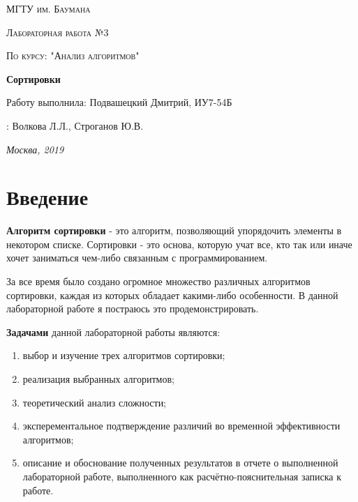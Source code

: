 \documentclass[12pt]{report}
\begin{document}
\begin{titlepage}
	\centering
	{\scshape\LARGE МГТУ им. Баумана \par}
	\vspace{3cm}
	{\scshape\Large Лабораторная работа №3\par}
	\vspace{0.5cm}	
	{\scshape\Large По курсу: "Анализ алгоритмов"\par}
	\vspace{1.5cm}
	{\huge\bfseries Сортировки\par}
	\vspace{2cm}
	\Large Работу выполнила: Подвашецкий Дмитрий, ИУ7-54Б\par
	\vspace{0.5cm}
	:  Волкова Л.Л., Строганов Ю.В.\par

	\vfill
	\large \textit {Москва, 2019} \par
\end{titlepage}

\tableofcontents

\newpage
\chapter*{Введение}

	\textbf{Алгоритм сортировки} - это алгоритм, позволяющий упорядочить элементы в некотором списке. Сортировки - это основа, которую учат все, кто так или иначе хочет заниматься чем-либо связанным с программированием. 

	За все время было создано огромное множество различных алгоритмов сортировки, каждая из которых обладает какими-либо особенности. В данной лабораторной работе я постраюсь это продемонстрировать.

	\textbf{Задачами} данной лабораторной работы являются:
\begin{enumerate}
	\item выбор и изучение трех алгоритмов сортировки;
	\item реализация выбранных алгоритмов;
	\item теоретический анализ сложности;
	\item эксперементальное подтверждение различий во временной эффективности алгоритмов;
	\item описание и обоснование полученных результатов в отчете о выполненной лабораторной
работе, выполненного как расчётно-пояснительная записка к работе.
\end{enumerate}
\end{document}

